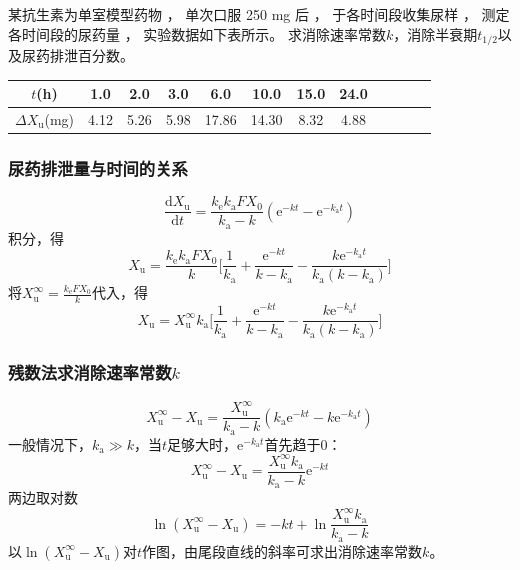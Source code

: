 \documentclass[dvipsnames, svgnames, x11names]{beamer}
\begin{document}
\begin{frame}[t]
    \frametitle{}
    \begin{example}
        某抗生素为单室模型药物 ， 单次口服 250 mg 后 ， 于各时间段收集尿样 ， 测定各时间段的尿药量 ， 实验数据如下表所示。 求消除速率常数$k$，消除半衰期$t_{1/2}$以及尿药排泄百分数。
        \begin{table}
            \centering
            \small
            \begin{tabular}{cccccccccccc}
                \bottomrule
                $t$(h) & 1.0 & 2.0 & 3.0 & 6.0 & 10.0 & 15.0 & 24.0  \\ \hline
                $\Delta X_\mathrm{u}$(mg) & 4.12 & 5.26 & 5.98 & 17.86 & 14.30 & 8.32 & 4.88 \hspace{-9pt} \\ \toprule 
            \end{tabular}
        \end{table}
    \end{example}
\end{frame}


\begin{frame}
    \frametitle{尿药排泄量与时间的关系}
    \[
        \frac{\mathrm{d}X_\mathrm{u}}{\mathrm{d}t}=\frac{k_\mathrm{e}k_\mathrm{a}FX_0}{k_\mathrm{a}-k}(\mathrm{e}^{-kt}-\mathrm{e}^{-k_\mathrm{a}t})
    \]
    积分，得
    \[
        X_\mathrm{u}=\frac{k_\mathrm{e}k_\mathrm{a}FX_0}{k}\Big[\frac{1}{k_\mathrm{a}}+\frac{\mathrm{e}^{-kt}}{k-k_\mathrm{a}}-\frac{k\mathrm{e}^{-k_\mathrm{a}t}}{k_\mathrm{a}(k-k_\mathrm{a})}\Big]
    \]
    将$X_\mathrm{u}^\infty = \frac{k_\mathrm{e}FX_0}{k}$代入，得
    \[
        X_\mathrm{u}=X_\mathrm{u}^\infty k_\mathrm{a}\Big[\frac{1}{k_\mathrm{a}}+\frac{\mathrm{e}^{-kt}}{k-k_\mathrm{a}}-\frac{k\mathrm{e}^{-k_\mathrm{a}t}}{k_\mathrm{a}(k-k_\mathrm{a})}\Big]
    \]
\end{frame}


\begin{frame}
    \frametitle{残数法求消除速率常数$k$}
    \[
        X_\mathrm{u}^\infty - X_\mathrm{u} = \frac{X_\mathrm{u}^\infty}{k_\mathrm{a} - k}(k_\mathrm{a}\mathrm{e}^{-kt} - k\mathrm{e}^{-k_\mathrm{a}t})
    \]
    一般情况下，$k_\mathrm{a}\gg k$，当$t$足够大时，$\mathrm{e}^{-k_\mathrm{a}t}$首先趋于0：
    \[
        X_\mathrm{u}^\infty - X_\mathrm{u} = \frac{X_\mathrm{u}^\infty k_\mathrm{a}}{k_\mathrm{a} - k}\mathrm{e}^{-kt}
    \]
    两边取对数
    \[
        \ln{(X_\mathrm{u}^\infty - X_\mathrm{u})} = -kt + \ln {\frac{X_\mathrm{u}^\infty k_\mathrm{a}}{k_\mathrm{a} - k}}
    \]
    以$\ln{(X_\mathrm{u}^\infty - X_\mathrm{u})}$对$t$作图，由尾段直线的斜率可求出消除速率常数$k$。
\end{frame}
\end{document}
